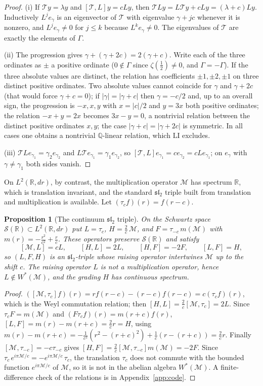 \documentclass[11pt]{amsart}
\newtheorem{proposition}[theorem]{Proposition}
\theoremstyle{definition}
\theoremstyle{remark}
\newcommand{\T}{\mathcal T}
\newcommand{\M}{\mathcal M}
\newcommand{\sltwo}{\mathfrak{sl}_2}
\begin{document}
\begin{proof}
(i) If $\T y=\lambda y$ and $[\T,L]y=cLy$, then $\T Ly=L\T y+cLy=(\lambda+c)Ly$.
Inductively $L^je_\gamma$ is an eigenvector of $\T$ with eigenvalue $\gamma+jc$
whenever it is nonzero, and $L^je_\gamma\ne0$ for $j\le k$ because
$L^ke_\gamma\neq0$. The eigenvalues of $\T$ are exactly the elements of $\Gamma$.

(ii) The progression gives $\gamma+(\gamma+2c)=2(\gamma+c)$. Write each of the
three ordinates as $\pm$ a positive ordinate ($0\notin\Gamma$ since
$\zeta(\frac12)\ne0$, and $\Gamma=-\Gamma$). If the three absolute values are
distinct, the relation has coefficients $\pm1,\pm2,\pm1$ on three distinct
positive ordinates. Two absolute values cannot coincide for $\gamma$ and
$\gamma+2c$ (that would force $\gamma+c=0$); if $|\gamma|=|\gamma+c|$ then
$\gamma=-c/2$ and, up to an overall sign, the progression is $-x,x,y$ with
$x=|c|/2$ and $y=3x$ both positive ordinates; the relation $-x+y=2x$ becomes
$3x-y=0$, a nontrivial relation between the distinct positive ordinates $x,y$;
the case $|\gamma+c|=|\gamma+2c|$ is
symmetric. In all cases one obtains a nontrivial $\mathbb Q$-linear relation,
which $\mathrm{LI}$ excludes.

(iii) $\T Le_{\gamma_1}=\gamma_2e_{\gamma_2}$ and $L\T e_{\gamma_1}=\gamma_1
e_{\gamma_2}$, so $[\T,L]e_{\gamma_1}=ce_{\gamma_2}=cLe_{\gamma_1}$; on
$e_\gamma$ with $\gamma\ne\gamma_1$ both sides vanish.
\end{proof}

On $L^2(\mathbb R,dr)$, by contrast, the multiplication operator $\M$ has
spectrum $\mathbb R$, which is translation invariant, and the standard $\sltwo$
triple built from translation and multiplication is available. Let
$(\tau_cf)(r)=f(r-c)$.

\begin{proposition}[The continuum $\sltwo$ triple]\label{prop:sl2}
On the Schwartz space $\mathcal S(\mathbb R)\subset L^2(\mathbb R,dr)$ put
$L=\tau_c$, $H=\tfrac2c\,\M$, and $F=\tau_{-c}\,m(\M)$ with
$m(r)=-\tfrac{r^2}{c^2}+\tfrac{r}{c}$. These operators preserve
$\mathcal S(\mathbb R)$ and satisfy
\[
[\M,L]=cL,\qquad [H,L]=2L,\qquad [H,F]=-2F,\qquad [L,F]=H,
\]
so $(L,F,H)$ is an $\sltwo$-triple whose raising operator intertwines $\M$ up to
the shift $c$. The raising operator $L$ is not a multiplication operator, hence
$L\notin W^*(\M)$, and the grading $H$ has continuous spectrum.
\end{proposition}

\begin{proof}
$([\M,\tau_c]f)(r)=rf(r-c)-(r-c)f(r-c)=c(\tau_cf)(r)$, which is the
Weyl commutation relation; then $[H,L]=\tfrac2c[\M,\tau_c]=2L$. Since
$\tau_cF=m(\M)$ and $(F\tau_cf)(r)=m(r+c)f(r)$,
$[L,F]=m(r)-m(r+c)=\tfrac2c r=H$, using
$m(r)-m(r+c)=-\tfrac{1}{c^2}(r^2-(r+c)^2)+\tfrac1c(r-(r+c))=\tfrac2c r$. Finally
$[\M,\tau_{-c}]=-c\tau_{-c}$ gives $[H,F]=\tfrac2c[\M,\tau_{-c}]m(\M)=-2F$. Since
$\tau_c\,e^{i\pi\M/c}=-e^{i\pi\M/c}\,\tau_c$, the translation $\tau_c$ does not
commute with the bounded function $e^{i\pi\M/c}$ of $\M$, so it is not in the
abelian algebra $W^*(\M)$. A finite-difference check of the relations is in
Appendix~\ref{app:code}.
\end{proof}
\end{document}
